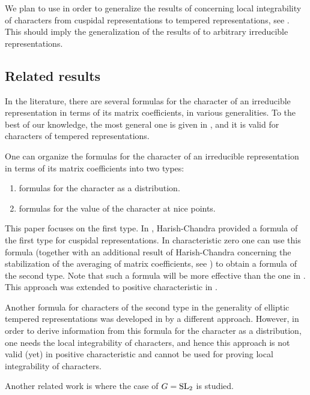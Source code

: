 \documentclass[12pt,a4paper]{amsart}%
\newcommand{\RamiA}[1]{{{#1}}}
\newcommand{\RamiF}[1]{{{#1}}}
\newcommand{\EitanD}[1]{{{#1}}}
\newcommand{\EitanC}[1]{{{#1}}}
\begin{document}
We plan to use  in order to generalize the results of 
\cite{AGKS2,AAGKS} \RamiA{concerning local integrability of characters from cuspidal representations} to tempered representations, see \cite{AGKS_int}.  This should imply \RamiF{the generalization of} the results {of 
\cite{AGKS2,AAGKS}} \RamiF{to} arbitrary \EitanD{irreducible} representations. 

\subsection{Related results}
\RamiA{In the literature, there are several formulas for the character of an irreducible representation in terms of {its} matrix coefficients, in various generalities. To the best of our knowledge, the most  general one is given 
in \cite{KYtempered}, and it is valid for characters of tempered representations.}

One can organize the formulas for the character \EitanC{of an irreducible representation} in terms of \EitanC{its} matrix coefficients into two types:
\begin{enumerate}
    \item formulas for
the character as a distribution.
\item
formulas for the value of the character at nice points.
\end{enumerate}
This paper focuses on the first type.
\EitanC{In \cite[Theorem 9]{HC_VD}, Harish-Chandra provided a formula of \EitanC{the first} type for cuspidal representations.}  In characteristic \EitanD{zero} one can use this formula (together with an additional result of Harish-Chandra concerning the stabilization of the averaging of matrix coefficients, see \cite[page 101]{HC_VD}) to obtain a formula of the second type. Note that such a formula will be more effective than the one in \cite[Theorem 9]{HC_VD}. This approach was extended to positive characteristic in \cite{AGKS_orb}. 

Another formula for characters of the second type in the generality of 
 elliptic tempered representations was developed in \cite{Art76, Art87, Art93} by a different approach. However, in order to derive information from this formula for the character as a distribution, one needs the local integrability of characters, and hence this approach is not valid (yet) in positive characteristic and cannot be used for proving local integrability of characters. 


Another related work \EitanC{is} \cite{BezKaz} where the case of $G=\operatorname{SL}_2$ is studied.
\end{document}
